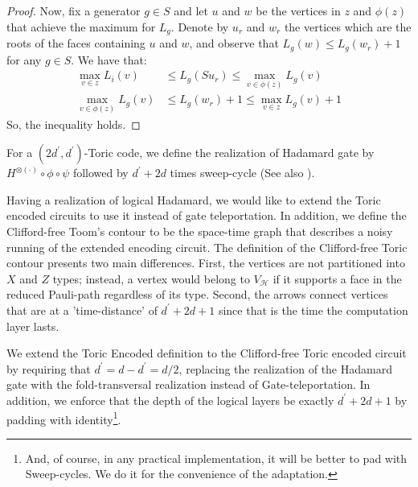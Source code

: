 \begin{proof}
Now, fix a generator $g \in S$ and let $u$ and $w$ be the vertices in $z$ and $\phi(z)$ that achieve the maximum for $L_{g}$. Denote by $u_{r}$ and $w_{r}$ the vertices which are the roots of the faces containing $u$ and $w$, and observe that $L_{g}(w) \le L_{g}(w_{r})+1$ for any $g \in S$. We have that:
    \begin{equation*}
      \begin{split}
        \max_{v \in z} L_{i}(v) &  \le   L_{g}(S u_{r}) \le  \max_{v \in \phi(z)} L_{g}(v)  \\
        \max_{v \in \phi(z)} L_{g}(v) & \le  L_{g}(w_{r})  + 1 \le  \max_{v \in z} L_{g}(v) + 1 
      \end{split}
    \end{equation*}
So, the inequality holds.
\end{proof}

\begin{definition}
  For a $(2d^{\prime},d^{\prime})$-Toric code, we define the realization of Hadamard gate by $ H^{\otimes (\cdot) } \circ \phi \circ \psi$ followed by $d^{\prime} + 2d$ times sweep-cycle (See also ). 
\end{definition}

Having a realization of logical Hadamard, we would like to extend the Toric encoded circuits to use it instead of gate teleportation. In addition, we define the Clifford-free Toom's contour to be the space-time graph that describes a noisy running of the extended encoding circuit. The definition of the Clifford-free Toric contour presents two main differences. First, the vertices are not partitioned into $X$ and $Z$ types; instead, a vertex would belong to $V_{\mathcal{H}}$ if it supports a face in the reduced Pauli-path regardless of its type. Second, the arrows connect vertices that are at a 'time-distance' of $d^{\prime}+2d +1$ since that is the time the computation layer lasts.

\begin{definition}
We extend the Toric Encoded definition to the Clifford-free Toric encoded circuit by requiring that $d^{\prime}=d-d^{\prime}=d/2$, replacing the realization of the Hadamard gate with the fold-transversal realization instead of Gate-teleportation. In addition, we enforce that the depth of the logical layers be exactly $d^{\prime}+2d+1$ by padding with identity\footnote{And, of course, in any practical implementation, it will be better to pad with Sweep-cycles. We do it for the convenience of the adaptation.}.
\end{definition}

